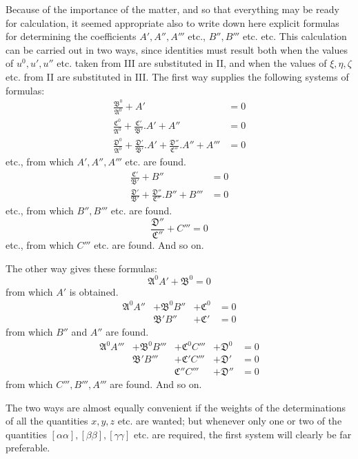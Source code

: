Because of the importance of the matter, and so that everything may be ready for calculation, it seemed appropriate also to write down here explicit formulas for determining the coefficients \(A',A'',A'''\) etc., \(B'',B'''\) etc. etc. This calculation can be carried out in two ways, since identities must result both when the values of \(u^0,u',u''\) etc. taken from III are substituted in II, and when the values of \(\xi,\eta,\zeta\) etc. from II are substituted in III. The first way supplies the following systems of formulas:
\[
\begin{aligned}
\frac{\mathfrak{B}^0}{\mathfrak{A}^0}+A'&=0\\[4pt]
\frac{\mathfrak{C}^0}{\mathfrak{A}^0}+\frac{\mathfrak{C}'}{\mathfrak{B}'}.A'+A''&=0\\[4pt]
\frac{\mathfrak{D}^0}{\mathfrak{A}^0}+\frac{\mathfrak{D}'}{\mathfrak{B}'}.A'+\frac{\mathfrak{D}''}{\mathfrak{C}''}.A''+A'''&=0
\end{aligned}
\]
etc., from which \(A',A'',A'''\) etc. are found.
\[
\begin{aligned}
\frac{\mathfrak{C}'}{\mathfrak{B}'}+B''&=0\\[4pt]
\frac{\mathfrak{D}'}{\mathfrak{B}'}+\frac{\mathfrak{D}''}{\mathfrak{C}''}.B''+B'''&=0
\end{aligned}
\]
etc., from which \(B'',B'''\) etc. are found.
\[
\frac{\mathfrak{D}''}{\mathfrak{C}''}+C'''=0
\]
etc., from which \(C'''\) etc. are found. And so on.

The other way gives these formulas:
\[
\mathfrak{A}^0A'+\mathfrak{B}^0=0
\]
from which \(A'\) is obtained.
\[
\begin{array}{rllll}
\mathfrak{A}^0A''&+\mathfrak{B}^0B''&+\mathfrak{C}^0&=0\\
&\mathfrak{B}'B''&+\mathfrak{C}'&=0
\end{array}
\]
from which \(B''\) and \(A''\) are found.
\[
\begin{array}{rlllll}
\mathfrak{A}^0A'''&+\mathfrak{B}^0B'''&+\mathfrak{C}^0C'''&+\mathfrak{D}^0&=0\\
&\mathfrak{B}'B'''&+\mathfrak{C}'C'''&+\mathfrak{D}'&=0\\
&&\mathfrak{C}''C'''&+\mathfrak{D}''&=0
\end{array}
\]
from which \(C''',B''',A'''\) are found. And so on.

The two ways are almost equally convenient if the weights of the determinations of all the quantities \(x,y,z\) etc. are wanted; but whenever only one or two of the quantities \([\alpha\alpha],\allowbreak[\beta\beta],\allowbreak[\gamma\gamma]\) etc. are required, the first system will clearly be far preferable.

